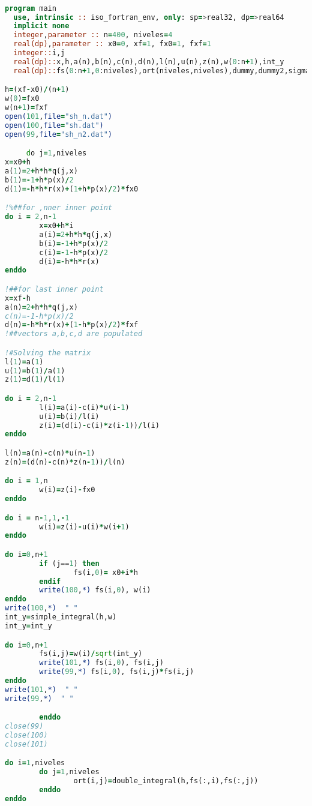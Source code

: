 \begin{code}\begin{lstlisting}[language=fortran,caption={Fortran code that solves the problem of a particle in a one dimentional infinite square well by the fine differences method. It solves for the functions, probability densities, orthogonality matrix, and a few statistically important integrals for the analisys of the first n energy levels. }, label=cd:fortran_gral]

program main
  use, intrinsic :: iso_fortran_env, only: sp=>real32, dp=>real64
  implicit none
  integer,parameter :: n=400, niveles=4
  real(dp),parameter :: x0=0, xf=1, fx0=1, fxf=1
  integer::i,j
  real(dp)::x,h,a(n),b(n),c(n),d(n),l(n),u(n),z(n),w(0:n+1),int_y
  real(dp)::fs(0:n+1,0:niveles),ort(niveles,niveles),dummy,dummy2,sigma

h=(xf-x0)/(n+1)
w(0)=fx0
w(n+1)=fxf
open(101,file="sh_n.dat")
open(100,file="sh.dat")
open(99,file="sh_n2.dat")

     do j=1,niveles
x=x0+h
a(1)=2+h*h*q(j,x) 
b(1)=-1+h*p(x)/2 
d(1)=-h*h*r(x)+(1+h*p(x)/2)*fx0 

!%##for ,nner inner point
do i = 2,n-1
        x=x0+h*i
        a(i)=2+h*h*q(j,x) 
        b(i)=-1+h*p(x)/2 
        c(i)=-1-h*p(x)/2 
        d(i)=-h*h*r(x)
enddo

!##for last inner point
x=xf-h
a(n)=2+h*h*q(j,x) 
c(n)=-1-h*p(x)/2 
d(n)=-h*h*r(x)+(1-h*p(x)/2)*fxf 
!##vectors a,b,c,d are populated

!#Solving the matrix
l(1)=a(1)
u(1)=b(1)/a(1)
z(1)=d(1)/l(1)

do i = 2,n-1
        l(i)=a(i)-c(i)*u(i-1)
        u(i)=b(i)/l(i)
        z(i)=(d(i)-c(i)*z(i-1))/l(i)
enddo

l(n)=a(n)-c(n)*u(n-1)
z(n)=(d(n)-c(n)*z(n-1))/l(n)

do i = 1,n
        w(i)=z(i)-fx0
enddo

do i = n-1,1,-1
        w(i)=z(i)-u(i)*w(i+1)
enddo

do i=0,n+1
        if (j==1) then
                fs(i,0)= x0+i*h
        endif
        write(100,*) fs(i,0), w(i)
enddo
write(100,*)  " "
int_y=simple_integral(h,w)
int_y=int_y

do i=0,n+1
        fs(i,j)=w(i)/sqrt(int_y)
        write(101,*) fs(i,0), fs(i,j)
        write(99,*) fs(i,0), fs(i,j)*fs(i,j)
enddo
write(101,*)  " "
write(99,*)  " "

        enddo
close(99)
close(100)
close(101)

do i=1,niveles
        do j=1,niveles
                ort(i,j)=double_integral(h,fs(:,i),fs(:,j))
        enddo
enddo


\end{lstlisting}
\end{code}
